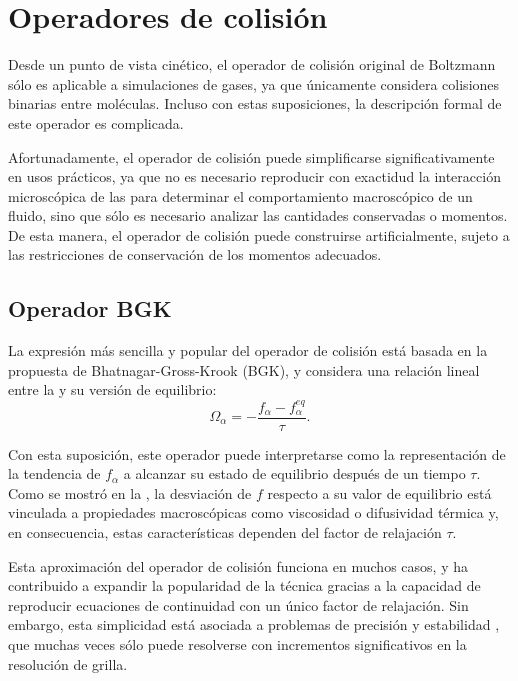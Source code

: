 \section{Operadores de colisi\'on}

Desde un punto de vista cin\'etico, el operador de colisi\'on original de Boltzmann s\'olo es aplicable a simulaciones de gases, ya que \'unicamente considera colisiones binarias entre mol\'eculas. Incluso con estas suposiciones, la descripci\'on formal de este operador es complicada.
\par 
Afortunadamente, el operador de colisi\'on puede simplificarse significativamente en usos pr\'acticos, ya que no es necesario reproducir con exactidud la interacci\'on microsc\'opica de las \fdp{} para determinar el comportamiento macrosc\'opico de un fluido, sino que s\'olo es necesario analizar las cantidades conservadas o momentos. De esta manera, el operador de colisi\'on puede construirse artificialmente, sujeto a las restricciones de conservaci\'on de los momentos adecuados.


\subsection{Operador BGK}

La expresi\'on m\'as sencilla y popular del operador de colisi\'on est\'a basada en la propuesta de Bhatnagar-Gross-Krook (BGK), y considera una relaci\'on lineal entre la \fdp{} y su versi\'on de equilibrio:
\begin{equation}
	\Omega_{\alpha} = -\dfrac{f_{\alpha} - f_{\alpha}^{eq}}{\tau}.
\end{equation}

Con esta suposici\'on, este operador puede interpretarse como la representaci\'on de la tendencia de $f_{\alpha}$ a alcanzar su estado de equilibrio despu\'es de un tiempo $\tau$. Como se mostr\'o en la , la desviaci\'on de $f$ respecto a su valor de equilibrio est\'a vinculada a propiedades macrosc\'opicas como viscosidad o difusividad t\'ermica y, en consecuencia, estas caracter\'isticas dependen del factor de relajaci\'on $\tau$.

Esta aproximaci\'on del operador de colisi\'on funciona en muchos casos, y ha contribuido a expandir la popularidad de la t\'ecnica gracias a la capacidad de reproducir ecuaciones de continuidad con un \'unico factor de relajaci\'on. Sin embargo, esta simplicidad  est\'a asociada a problemas de precisi\'on y estabilidad \cite{holdych_truncation_2004, silva_truncation_2014}, que muchas veces s\'olo puede resolverse con incrementos significativos en la resoluci\'on de grilla.


